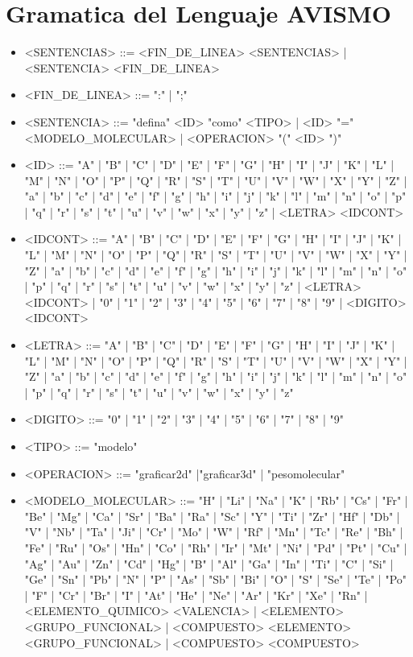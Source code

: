 \section{Gramatica del Lenguaje AVISMO}

\begin{itemize}
    \item <SENTENCIAS> ::= <FIN\_DE\_LINEA> <SENTENCIAS> | <SENTENCIA> <FIN\_DE\_LINEA>
    \item <FIN\_DE\_LINEA> ::= ":" | ";"
    \item <SENTENCIA> ::= "defina" <ID> "como" <TIPO> | <ID> "="  <MODELO\_MOLECULAR> | <OPERACION> "(" <ID> ")"
    \item <ID> ::= "A" | "B" | "C" | "D" | "E" | "F" | "G" | "H" | "I" | "J" | "K" | "L" | "M" | "N" | "O" | "P" | "Q" | "R" | "S" | "T" | "U" | "V" | "W" | "X" | "Y" | "Z" | "a" | "b" | "c" | "d" | "e" | "f" | "g" | "h" | "i" | "j" | "k" | "l" | "m" | "n" | "o" | "p" | "q" | "r" | "s" | "t" | "u" | "v" | "w" | "x" | "y" | "z" | <LETRA> <IDCONT>
    \item <IDCONT> ::= "A" | "B" | "C" | "D" | "E" | "F" | "G" | "H" | "I" | "J" | "K" | "L" | "M" | "N" | "O" | "P" | "Q" | "R" | "S" | "T" | "U" | "V" | "W" | "X" | "Y" | "Z" | "a" | "b" | "c" | "d" | "e" | "f" | "g" | "h" | "i" | "j" | "k" | "l" | "m" | "n" | "o" | "p" | "q" | "r" | "s" | "t" | "u" | "v" | "w" | "x" | "y" | "z" | <LETRA> <IDCONT> | "0" | "1" | "2" | "3" | "4" | "5" | "6" | "7" | "8" | "9" | <DIGITO> <IDCONT>
    \item <LETRA> ::= "A" | "B" | "C" | "D" | "E" | "F" | "G" | "H" | "I" | "J" | "K" | "L" | "M" | "N" | "O" | "P" | "Q" | "R" | "S" | "T" | "U" | "V" | "W" | "X" | "Y" | "Z" | "a" | "b" | "c" | "d" | "e" | "f" | "g" | "h" | "i" | "j" | "k" | "l" | "m" | "n" | "o" | "p" | "q" | "r" | "s" | "t" | "u" | "v" | "w" | "x" | "y" | "z"
    \item <DIGITO> ::= "0" | "1" | "2" | "3" | "4" | "5" | "6" | "7" | "8" | "9"
    \item <TIPO> ::= "modelo"
    \item <OPERACION> ::= "graficar2d" |"graficar3d" | "pesomolecular"
    \item <MODELO\_MOLECULAR> ::= "H" | "Li" | "Na" | "K" | "Rb" | "Cs" | "Fr" | "Be" | "Mg" | "Ca" | "Sr" | "Ba" | "Ra" | "Sc" | "Y" | "Ti" | "Zr" | "Hf" | "Db" | "V" | "Nb" | "Ta" | "Ji" | "Cr" | "Mo" | "W" | "Rf" | "Mn" | "Tc" | "Re" | "Bh" | "Fe" | "Ru" | "Os" | "Hn" | "Co" | "Rh" | "Ir" | "Mt" | "Ni" | "Pd" | "Pt" | "Cu" | "Ag" | "Au" | "Zn" | "Cd" | "Hg" | "B" | "Al" | "Ga" | "In" | "Ti" | "C" | "Si" | "Ge" | "Sn" | "Pb" | "N" | "P" | "As" | "Sb" | "Bi" | "O" | "S" | "Se" | "Te" | "Po" | "F" | "Cr" | "Br" | "I" | "At" | "He" | "Ne" | "Ar" | "Kr" | "Xe" | "Rn" | <ELEMENTO\_QUIMICO> <VALENCIA> | <ELEMENTO> <GRUPO\_FUNCIONAL> | <COMPUESTO> <ELEMENTO> <GRUPO\_FUNCIONAL> | <COMPUESTO> <COMPUESTO>

\end{itemize}
